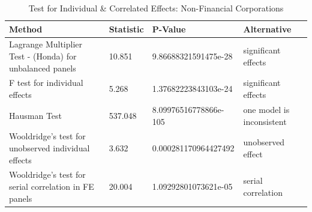 \begin{table}[ht]
\centering
\caption{ Test for Individual & Correlated Effects: Non-Financial Corporations} 
\begingroup\small
\begin{tabular}{llll}
  \toprule
Method & Statistic & P-Value & Alternative \\ 
  \midrule
Lagrange Multiplier Test -  (Honda) for unbalanced panels & 10.851 & 9.86688321591475e-28 & significant effects \\ 
  F test for individual effects & 5.268 & 1.37682223843103e-24 & significant effects \\ 
  Hausman Test & 537.048 & 8.09976516778866e-105 & one model is inconsistent \\ 
  Wooldridge's test for unobserved individual effects & 3.632 & 0.000281170964427492 & unobserved effect \\ 
  Wooldridge's test for serial correlation in FE panels & 20.004 & 1.09292801073621e-05 & serial correlation \\ 
   \bottomrule
\end{tabular}
\endgroup
\end{table}
